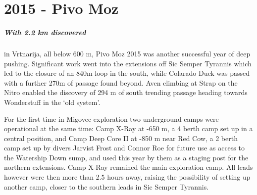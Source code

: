 \newpage
\begin{tcolorbox}
	

\end{tcolorbox}
\BgThispage


\chapter{2015 - Pivo Moz}
		\paragraph{With 2.2 km discovered} in Vrtnarija, all below 600 m, Pivo Moz 2015 was another successful year of deep pushing. Significant work went into the extensions off Sic Semper Tyrannis which led to the closure of an 840m loop in the south, while Colarado Duck was passed with a further 270m of passage found beyond. Aven climbing at Strap on the Nitro enabled the discovery of 294 m of south trending passage heading towards Wonderstuff in the ‘old system’. 

		For the first time in Migovec exploration two underground camps were operational at the same time: Camp X-Ray at -650 m, a 4 berth camp set up in a central position, and Camp Deep Core II at -850 m near Red Cow, a 2 berth camp set up by divers Jarvist Frost and Connor Roe for future use as access to the Watership Down sump, and used this year by them as a staging post for the northern extensions. Camp X-Ray remained the main exploration camp. All leads however were then more than 2.5 hours away, raising the possibility of setting up another camp, closer to the southern leads in Sic Semper Tyrannis.
		\\
		\\
		\\


